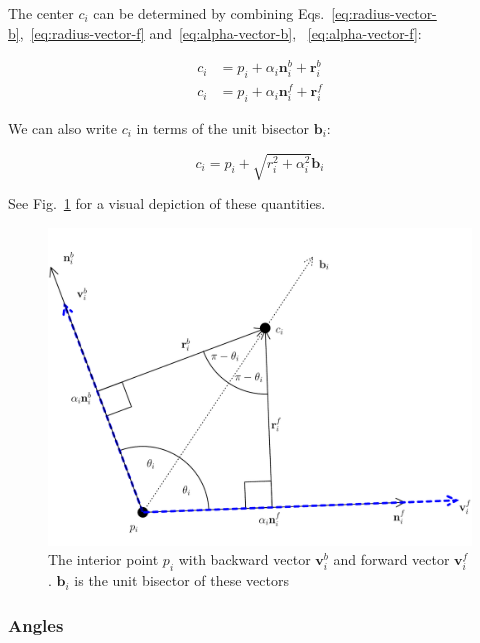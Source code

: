 \documentclass{article}
\begin{document}
The center $c_{i}$ can be determined by combining Eqs.~\eqref{eq:radius-vector-b},~\eqref{eq:radius-vector-f} and~\eqref{eq:alpha-vector-b}, ~\eqref{eq:alpha-vector-f}:

\begin{align}
  \label{eq:center-vector-b}
  c_{i} &= p_{i} + \alpha_i\mathbf{n}^b_i + \mathbf{r}^{b}_{i}\\
  \label{eq:center-vector-f}
  c_{i} &= p_{i} + \alpha_i\mathbf{n}^f_i + \mathbf{r}^{f}_{i}
\end{align}

We can also write $c_{i}$ in terms of the unit bisector $\mathbf{b}_{i}$:

\begin{equation}
  \label{eq:center-bisector}
  c_{i} = p_{i} + \sqrt{r_{i}^{2} + \alpha_{i}^{2}}\mathbf{b}_{i}
\end{equation}

See Fig.~\ref{fig:interior-point} for a visual depiction of these quantities.

\begin{figure}[h]
  \centering
  \includegraphics[width=\columnwidth]{4}
  \caption{The interior point $p_{i}$ with backward vector $\mathbf{v}^{b}_{i}$ and forward vector $\mathbf{v}^{f}_{i}$. $\mathbf{b}_{i}$ is the unit bisector of these vectors}
  \label{fig:interior-point}
\end{figure}

\subsubsection{Angles}
\end{document}
